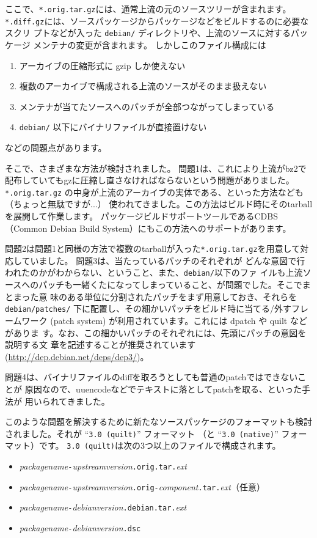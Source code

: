 \documentclass[mingoth,a4paper]{jsarticle}
\begin{document}
ここで、\verb|*.orig.tar.gz|には、通常上流の元のソースツリーが含まれます。
\verb|*.diff.gz|には、ソースパッケージからパッケージなどをビルドするのに必要なスクリ
プトなどが入った \verb|debian/| ディレクトリや、上流のソースに対するパッケージ
メンテナの変更が含まれます。
しかしこのファイル構成には
\begin{enumerate}
 \item アーカイブの圧縮形式に gzip しか使えない
 \item 複数のアーカイブで構成される上流のソースがそのまま扱えない
 \item メンテナが当てたソースへのパッチが全部つながってしまっている
 \item \verb|debian/| 以下にバイナリファイルが直接置けない
\end{enumerate}
などの問題点があります。

そこで、さまざまな方法が検討されました。
問題1は、これにより上流がbz2で配布していてもgzに圧縮し直さなければならないという問題がありました。
\verb|*.orig.tar.gz| の中身が上流のアーカイブの実体である、といった方法なども（ちょっと無駄ですが...）
使われてきました。この方法はビルド時にそのtarballを展開して作業します。
パッケージビルドサポートツールであるCDBS（Common Debian Build System）にもこの方法へのサポートがあります。

問題2は問題1と同様の方法で複数のtarballが入った\verb|*.orig.tar.gz|を用意して対応していました。
問題3は、当たっているパッチのそれぞれが
どんな意図で行われたのかがわからない、ということ、また、\verb|debian/|以下のファ
イルも上流ソースへのパッチも一緒くたになってしまっていること、が問題でした。そこでまとまった意
味のある単位に分割されたパッチをまず用意しておき、それらを
\verb|debian/patches/| 下に配置し、その細かいパッチをビルド時に当てる/外すフレームワーク
(patch system) が利用されています。これには dpatch や quilt などがありま
す。なお、この細かいパッチのそれぞれには、先頭にパッチの意図を説明する文
章を記述することが推奨されています(\url{http://dep.debian.net/deps/dep3/})。

問題4は、バイナリファイルのdiffを取ろうとしても普通のpatchではできないことが
原因なので、uuencodeなどでテキストに落としてpatchを取る、といった手法が
用いられてきました。

このような問題を解決するために新たなソースパッケージのフォーマットも検討
されました。それが ``\verb|3.0 (quilt)|'' フォーマット
（と ``\verb|3.0 (native)|'' フォーマット）です。
\verb|3.0 (quilt)|は次の3つ以上のファイルで構成されます。
\begin{itemize}
 \item \textit{packagename}\verb|-|\textit{upstreamversion}\verb|.orig.tar.|\textit{ext}
 \item
      \textit{packagename}\verb|-|\textit{upstreamversion}\verb|.orig-|\textit{component}\verb|.tar.|\textit{ext}（任意）
 \item \textit{packagename}\verb|-|\textit{debianversion}\verb|.debian.tar.|\textit{ext}
 \item \textit{packagename}\verb|-|\textit{debianversion}\verb|.dsc|
\end{itemize}
\end{document}
